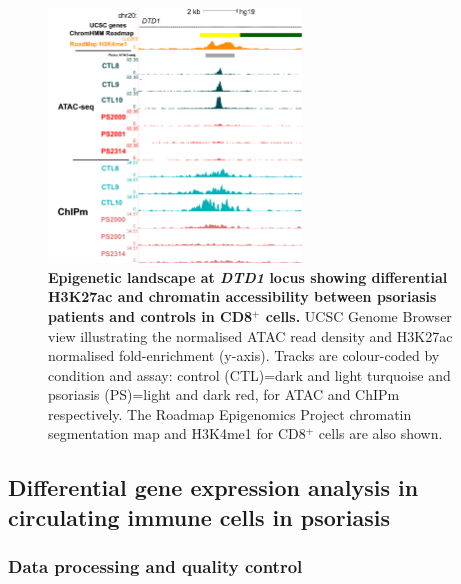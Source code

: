 
\begin{figure}[htbp]
\centering
\includegraphics[width=0.6\textwidth]{./Results2/pdfs/ChIPm_H3K27ac_UCSC_CD8_DTD1_track}
\caption[Epigenetic landscape at \textit{DTD1} locus showing differential H3K27ac and chromatin accessibility between psoriasis patients and controls in CD8$^+$ cells.]{\textbf{Epigenetic landscape at \textit{DTD1} locus showing differential H3K27ac and chromatin accessibility between psoriasis patients and controls in CD8$^+$ cells.} UCSC Genome Browser view illustrating the normalised ATAC read density and H3K27ac normalised fold-enrichment (y-axis). Tracks are colour-coded by condition and assay: control (CTL)=dark and light turquoise and psoriasis (PS)=light and dark red, for ATAC and ChIPm respectively. The Roadmap Epigenomics Project chromatin segmentation map and H3K4me1 for CD8$^+$ cells are also shown.}
\label{figure:ATAC_ChIPm_overlap_DTD1_region_track}
\end{figure}




\subsection{Differential gene expression analysis in circulating immune cells in psoriasis}



\subsubsection{Data processing and quality control}

